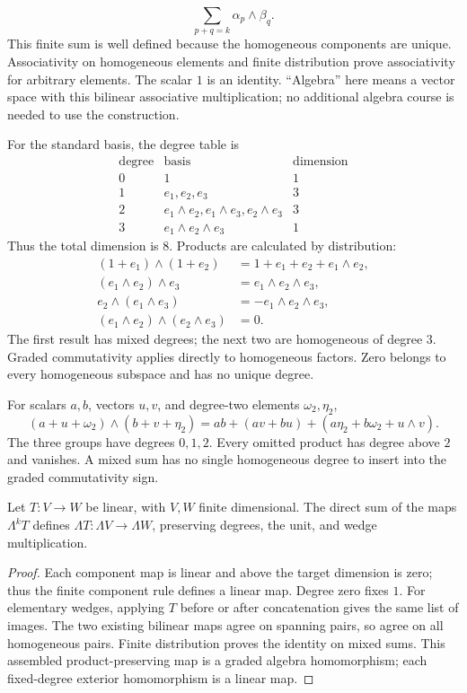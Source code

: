 \[
\sum_{p+q=k}\alpha_p\wedge\beta_q.
\]
 This finite sum is well defined
because the homogeneous components are unique. Associativity on homogeneous
elements and finite distribution prove associativity for arbitrary elements.
The scalar $1$ is an identity. ``Algebra'' here means a vector space with
this bilinear associative multiplication; no additional algebra course is
needed to use the construction.
\begin{example}
For the standard basis, the degree table is
\[
\begin{array}{c|l|c}
\text{degree}&\text{basis}&\text{dimension}\\\hline
0&1&1\\
1&e_1,e_2,e_3&3\\
2&e_1\wedge e_2,e_1\wedge e_3,e_2\wedge e_3&3\\
3&e_1\wedge e_2\wedge e_3&1
\end{array}
\]
Thus the total dimension is $8$. Products are calculated by distribution:
\begin{align*}
(1+e_1)\wedge(1+e_2)&=1+e_1+e_2+e_1\wedge e_2,\\
(e_1\wedge e_2)\wedge e_3&=e_1\wedge e_2\wedge e_3,\\
e_2\wedge(e_1\wedge e_3)&=-e_1\wedge e_2\wedge e_3,\\
(e_1\wedge e_2)\wedge(e_2\wedge e_3)&=0.
\end{align*}
The first result has mixed degrees; the next two are homogeneous of degree
$3$. Graded commutativity applies directly to homogeneous factors.
Zero belongs to every homogeneous subspace and has no unique degree.
\end{example}

\begin{example}
For scalars $a,b$, vectors $u,v$, and degree-two elements $\omega_2,\eta_2$,
\[
(a+u+\omega_2)\wedge(b+v+\eta_2)
=ab+(av+bu)+(a\eta_2+b\omega_2+u\wedge v).
\]
The three groups have degrees $0,1,2$. Every omitted product has degree
above $2$ and vanishes. A mixed sum has no single homogeneous degree to
insert into the graded commutativity sign.
\end{example}
\begin{proposition}
Let $T:V\to W$ be linear, with $V,W$ finite dimensional. The direct sum of the maps $\Lambda^kT$
defines $\Lambda T:\Lambda V\to\Lambda W$, preserving degrees, the unit,
and wedge multiplication.
\end{proposition}
\begin{proof}
Each component map is linear and above the target dimension is zero;
thus the finite component rule defines a linear map. Degree zero fixes $1$.
For elementary wedges, applying $T$ before or after concatenation gives
the same list of images. The two existing bilinear maps agree on spanning
pairs, so agree on all homogeneous pairs. Finite distribution proves the
identity on mixed sums. This assembled product-preserving map is a graded
algebra homomorphism; each fixed-degree exterior homomorphism is a linear map.
\end{proof}

